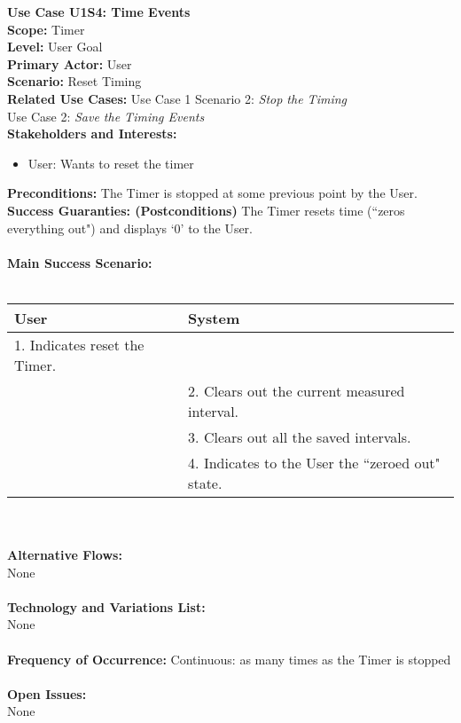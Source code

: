 \documentclass[letterpaper]{article}
\begin{document}
\noindent
\textbf{Use Case U1S4:  Time Events}\\
\textbf{Scope:  }Timer\\
\textbf{Level:  }User Goal\\
\textbf{Primary Actor:  }User\\
\textbf{Scenario:  }Reset Timing\\
\textbf{Related Use Cases:  }Use Case 1 Scenario 2:
\textit{Stop the Timing}\\
Use Case 2: \textit{Save the Timing Events}\\
\textbf{Stakeholders and Interests:}
\begin{itemize}
\item User:  Wants to reset the timer
\end{itemize}
\textbf{Preconditions:  }The Timer is stopped at some previous
point by the User.\\
\textbf{Success Guaranties:  (Postconditions)} The Timer resets
time (``zeros everything out") and displays `0' to the User.\\\\
\textbf{Main Success Scenario: }\\\\
\begin{tabular}{|p{6cm}|p{6cm}|}\hline
\textbf{User} & \textbf{System}\\\hline
1.  Indicates reset the Timer. & \\\hline
&2.  Clears out the current measured interval.\\\hline
&3.  Clears out all the saved intervals.\\\hline
&4.  Indicates to the User the ``zeroed out" state.\\\hline
\end{tabular}\\\\
\textbf{Alternative Flows:  }\\
None\\\\
\textbf{Technology and Variations List:  }\\
None\\\\
\textbf{Frequency of Occurrence:  } Continuous:  as many times as the
Timer is stopped\\\\
\textbf{Open Issues:  }\\
None
\end{document}
